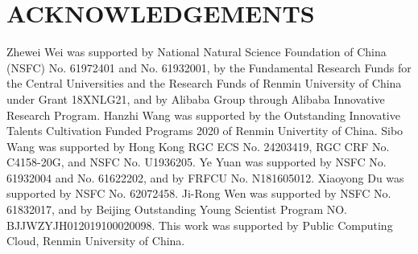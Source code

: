 \section{ACKNOWLEDGEMENTS}
Zhewei Wei was supported by National Natural Science Foundation of China (NSFC) No. 61972401 and No. 61932001, by the Fundamental Research Funds for the Central Universities and the Research Funds of Renmin University of China under Grant 18XNLG21, and by Alibaba Group through Alibaba Innovative Research Program. 
Hanzhi Wang was supported by the Outstanding Innovative Talents Cultivation Funded Programs 2020 of Renmin Univertity of China.
Sibo Wang was supported by Hong Kong RGC ECS No. 24203419, RGC CRF No. C4158-20G, and NSFC No. U1936205. 
Ye Yuan was supported by NSFC No. 61932004 and No. 61622202, and by FRFCU No. N181605012. 
Xiaoyong Du was supported by NSFC No. 62072458. 
Ji-Rong Wen was supported by NSFC  No. 61832017, and by Beijing Outstanding Young Scientist Program NO. BJJWZYJH012019100020098. 
This work was supported by Public Computing Cloud, Renmin University of China.


